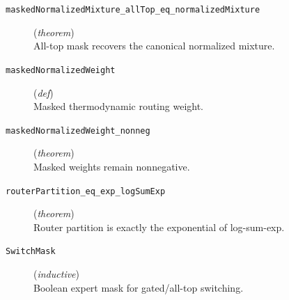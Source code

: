 \documentclass[11pt,a4paper]{article}
\begin{document}
\begin{description}
  \item[\texttt{maskedNormalizedMixture\_allTop\_eq\_normalizedMixture}] (\textit{theorem}) \\ All-top mask recovers the canonical normalized mixture.
  \item[\texttt{maskedNormalizedWeight}] (\textit{def}) \\ Masked thermodynamic routing weight.
  \item[\texttt{maskedNormalizedWeight\_nonneg}] (\textit{theorem}) \\ Masked weights remain nonnegative.
  \item[\texttt{routerPartition\_eq\_exp\_logSumExp}] (\textit{theorem}) \\ Router partition is exactly the exponential of log-sum-exp.
  \item[\texttt{SwitchMask}] (\textit{inductive}) \\ Boolean expert mask for gated/all-top switching.
\end{description}
\end{document}
